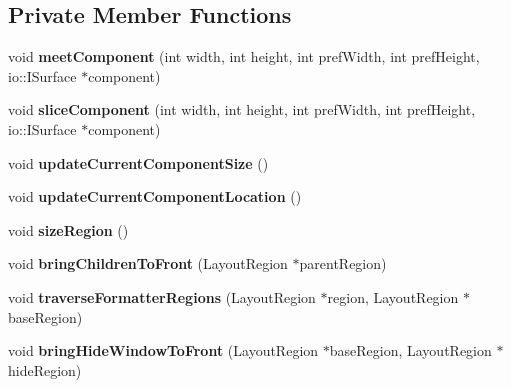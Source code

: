 \subsection*{Private Member Functions}
\begin{CompactItemize}
\item 
void \textbf{meetComponent} (int width, int height, int prefWidth, int prefHeight, io::ISurface $\ast$component)\label{classbr_1_1pucrio_1_1telemidia_1_1ginga_1_1ncl_1_1model_1_1presentation_1_1FormatterRegion_cac81a9329c3df95a4c8e21a5997ef7b}

\item 
void \textbf{sliceComponent} (int width, int height, int prefWidth, int prefHeight, io::ISurface $\ast$component)\label{classbr_1_1pucrio_1_1telemidia_1_1ginga_1_1ncl_1_1model_1_1presentation_1_1FormatterRegion_adc578f5a51b86c757e62dc90482fc97}

\item 
void \textbf{updateCurrentComponentSize} ()\label{classbr_1_1pucrio_1_1telemidia_1_1ginga_1_1ncl_1_1model_1_1presentation_1_1FormatterRegion_7f10ae3a5a0a1b1b2020d991e47659fa}

\item 
void \textbf{updateCurrentComponentLocation} ()\label{classbr_1_1pucrio_1_1telemidia_1_1ginga_1_1ncl_1_1model_1_1presentation_1_1FormatterRegion_653fb3cd4f8c80e92bdd7c52826d46de}

\item 
void \textbf{sizeRegion} ()\label{classbr_1_1pucrio_1_1telemidia_1_1ginga_1_1ncl_1_1model_1_1presentation_1_1FormatterRegion_6fa68a397fcfdbaeda27a90994a88a16}

\item 
void \textbf{bringChildrenToFront} (LayoutRegion $\ast$parentRegion)\label{classbr_1_1pucrio_1_1telemidia_1_1ginga_1_1ncl_1_1model_1_1presentation_1_1FormatterRegion_9a03e67da73bf122155f40ede1613c53}

\item 
void \textbf{traverseFormatterRegions} (LayoutRegion $\ast$region, LayoutRegion $\ast$baseRegion)\label{classbr_1_1pucrio_1_1telemidia_1_1ginga_1_1ncl_1_1model_1_1presentation_1_1FormatterRegion_e2e5998e6782a9c5c1455662697b5fc6}

\item 
void \textbf{bringHideWindowToFront} (LayoutRegion $\ast$baseRegion, LayoutRegion $\ast$hideRegion)\label{classbr_1_1pucrio_1_1telemidia_1_1ginga_1_1ncl_1_1model_1_1presentation_1_1FormatterRegion_43b1dfb19d3d13c2f2ffbbdc75df6a80}


\end{CompactItemize}
